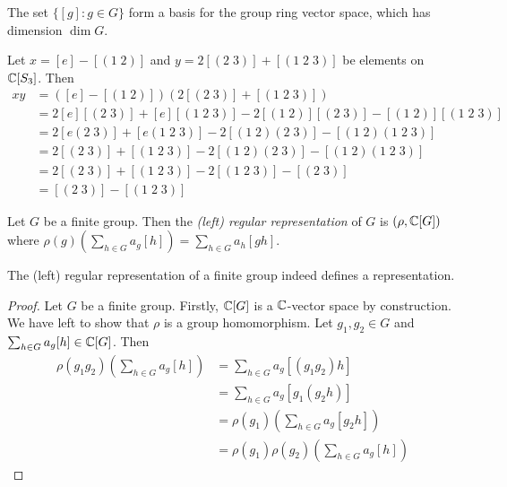 The set $\{[g]: g\in G\}$ form a basis for the group ring vector space, which has dimension $\dim G$.

\begin{example}
  Let $x = [e] - [(1\;2)]$ and $y = 2[(2\;3)] + [(1\;2\;3)]$ be elements on $\mathbb{C}[S_3]$. Then
  \begin{align*}
    xy & = \left([e] - [(1\;2)]\right)(2[(2\;3)] + [(1\;2\;3)])                   \\
       & = 2[e][(2\;3)] + [e][(1\;2\;3)] - 2[(1\;2)][(2\;3)] -[(1\;2)][(1\;2\;3)] \\
       & = 2[e(2\;3)] + [e(1\;2\;3)] - 2[(1\;2)(2\;3)] -[(1\;2)(1\;2\;3)]         \\
       & = 2[(2\;3)] + [(1\;2\;3)] - 2[(1\;2)(2\;3)] -[(1\;2)(1\;2\;3)]           \\
       & = 2[(2\;3)] + [(1\;2\;3)] - 2[(1\;2\;3)] -[(2\;3)]                       \\
       & = [(2\;3)] - [(1\;2\;3)]
  \end{align*}
\end{example}

\begin{definition}
  Let $G$ be a finite group. Then the \emph{(left) regular representation} of $G$ is $(\rho, \mathbb{C}[G])$ where $\rho(g)\left(\sum_{h\in G} a_g[h]\right)=\sum_{h\in G} a_h[gh]$.
\end{definition}

\begin{proposition}
  The (left) regular representation of a finite group indeed defines a representation.
\end{proposition}

\begin{proof}
  Let $G$ be a finite group. Firstly, $\mathbb{C}[G]$ is a $\mathbb{C}$-vector space by construction. We have left to show that $\rho$ is a group homomorphism. Let $g_1, g_2 \in G$ and $\sum_{h \in G} a_g[h] \in \mathbb{C}[G]$. Then
  \begin{align*}
    \rho(g_1g_2) \left(\sum_{h\in G} a_g[h]\right)
     & =\sum_{h\in G} a_g[(g_1g_2)h]                         \\
     & =\sum_{h\in G} a_g[g_1(g_2h)]                         \\
     & =\rho(g_1) \left(\sum_{h\in G} a_g[g_2h]\right)       \\
     & =\rho(g_1)\rho(g_2) \left(\sum_{h\in G} a_g[h]\right)
  \end{align*}
\end{proof}

